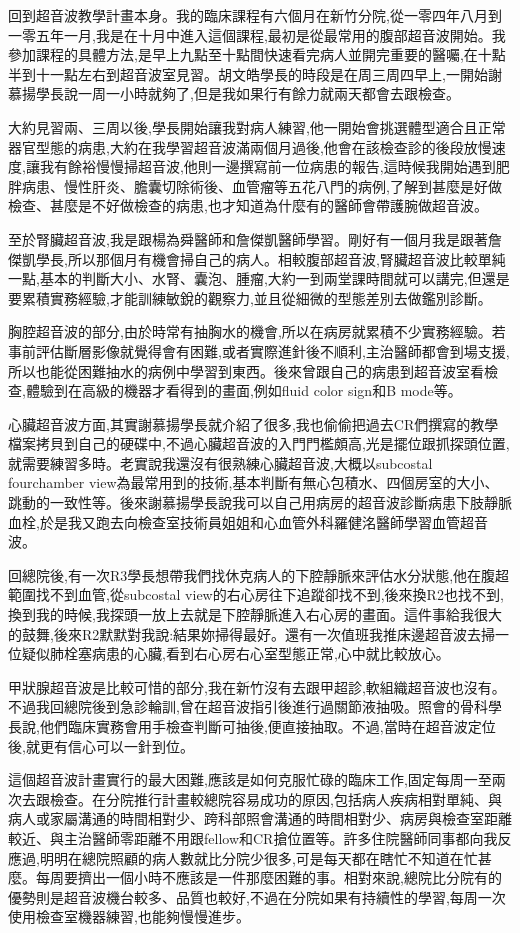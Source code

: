 \documentclass[12pt,a4paper]{article}
\begin{document}
回到超音波教學計畫本身。我的臨床課程有六個月在新竹分院,從一零四年八月到一零五年一月,我是在十月中進入這個課程,最初是從最常用的腹部超音波開始。我參加課程的具體方法,是早上九點至十點間快速看完病人並開完重要的醫囑,在十點半到十一點左右到超音波室見習。胡文皓學長的時段是在周三周四早上,一開始謝慕揚學長說一周一小時就夠了,但是我如果行有餘力就兩天都會去跟檢查。

大約見習兩、三周以後,學長開始讓我對病人練習,他一開始會挑選體型適合且正常器官型態的病患,大約在我學習超音波滿兩個月過後,他會在該檢查診的後段放慢速度,讓我有餘裕慢慢掃超音波,他則一邊撰寫前一位病患的報告,這時候我開始遇到肥胖病患、慢性肝炎、膽囊切除術後、血管瘤等五花八門的病例,了解到甚麼是好做檢查、甚麼是不好做檢查的病患,也才知道為什麼有的醫師會帶護腕做超音波。

至於腎臟超音波,我是跟楊為舜醫師和詹傑凱醫師學習。剛好有一個月我是跟著詹傑凱學長,所以那個月有機會掃自己的病人。相較腹部超音波,腎臟超音波比較單純一點,基本的判斷大小、水腎、囊泡、腫瘤,大約一到兩堂課時間就可以講完,但還是要累積實務經驗,才能訓練敏銳的觀察力,並且從細微的型態差別去做鑑別診斷。

胸腔超音波的部分,由於時常有抽胸水的機會,所以在病房就累積不少實務經驗。若事前評估斷層影像就覺得會有困難,或者實際進針後不順利,主治醫師都會到場支援,所以也能從困難抽水的病例中學習到東西。後來曾跟自己的病患到超音波室看檢查,體驗到在高級的機器才看得到的畫面,例如fluid color sign和B mode等。

心臟超音波方面,其實謝慕揚學長就介紹了很多,我也偷偷把過去CR們撰寫的教學檔案拷貝到自己的硬碟中,不過心臟超音波的入門門檻頗高,光是擺位跟抓探頭位置,就需要練習多時。老實說我還沒有很熟練心臟超音波,大概以subcostal fourchamber view為最常用到的技術,基本判斷有無心包積水、四個房室的大小、跳動的一致性等。後來謝慕揚學長說我可以自己用病房的超音波診斷病患下肢靜脈血栓,於是我又跑去向檢查室技術員姐姐和心血管外科羅健洺醫師學習血管超音波。

回總院後,有一次R3學長想帶我們找休克病人的下腔靜脈來評估水分狀態,他在腹超範圍找不到血管,從subcostal view的右心房往下追蹤卻找不到,後來換R2也找不到,換到我的時候,我探頭一放上去就是下腔靜脈進入右心房的畫面。這件事給我很大的鼓舞,後來R2默默對我說:結果妳掃得最好。還有一次值班我推床邊超音波去掃一位疑似肺栓塞病患的心臟,看到右心房右心室型態正常,心中就比較放心。

甲狀腺超音波是比較可惜的部分,我在新竹沒有去跟甲超診,軟組織超音波也沒有。不過我回總院後到急診輪訓,曾在超音波指引後進行過關節液抽吸。照會的骨科學長說,他們臨床實務會用手檢查判斷可抽後,便直接抽取。不過,當時在超音波定位後,就更有信心可以一針到位。

這個超音波計畫實行的最大困難,應該是如何克服忙碌的臨床工作,固定每周一至兩次去跟檢查。在分院推行計畫較總院容易成功的原因,包括病人疾病相對單純、與病人或家屬溝通的時間相對少、跨科部照會溝通的時間相對少、病房與檢查室距離較近、與主治醫師零距離不用跟fellow和CR搶位置等。許多住院醫師同事都向我反應過,明明在總院照顧的病人數就比分院少很多,可是每天都在瞎忙不知道在忙甚麼。每周要擠出一個小時不應該是一件那麼困難的事。相對來說,總院比分院有的優勢則是超音波機台較多、品質也較好,不過在分院如果有持續性的學習,每周一次使用檢查室機器練習,也能夠慢慢進步。
\end{document}
